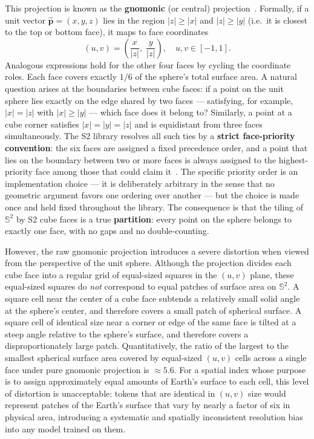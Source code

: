 \documentclass{book}
\begin{document}
This projection is known as the \textbf{gnomonic} (or central)
projection~\cite{snyder1987map}.  Formally, if a unit vector
$\hat{\mathbf{p}} = (x, y, z)$ lies in the region $|z| \geq |x|$ and
$|z| \geq |y|$ (i.e.\ it is closest to the top or bottom face), it
maps to face coordinates
\begin{equation}
  (u, v) = \left(\frac{x}{|z|},\; \frac{y}{|z|}\right),
  \quad u, v \in [-1, 1].
  \label{eq:gnomonic}
\end{equation}
Analogous expressions hold for the other four faces by cycling the
coordinate roles.  Each face covers exactly $1/6$ of the sphere's total
surface area. A natural question arises at the boundaries between cube
faces: if a point on the unit sphere lies exactly on the edge shared
by two faces --- satisfying, for example, $|x| = |z|$ with
$|x| \geq |y|$ --- which face does it belong to?  Similarly, a point
at a cube corner satisfies $|x| = |y| = |z|$ and is equidistant from
three faces simultaneously.  The S2 library resolves all such ties by
a \textbf{strict face-priority convention}: the six faces are assigned
a fixed precedence order, and a point that lies on the boundary
between two or more faces is always assigned to the highest-priority
face among those that could claim it~\cite{s2geometry}.  The specific
priority order is an implementation choice --- it is deliberately
arbitrary in the sense that no geometric argument favors one ordering
over another --- but the choice is made once and held fixed throughout
the library.  The consequence is that the tiling of $\mathbb{S}^2$
by S2 cube faces is a true \textbf{partition}: every point on the
sphere belongs to exactly one face, with no gaps and no
double-counting.

However, the raw gnomonic projection introduces a severe distortion
when viewed from the perspective of the unit sphere.  Although the
projection divides each cube face into a regular grid of equal-sized
squares in the $(u, v)$ plane, these equal-sized squares do \emph{not}
correspond to equal patches of surface area on $\mathbb{S}^2$.  A
square cell near the center of a cube face subtends a relatively small
solid angle at the sphere's center, and therefore covers a small patch
of spherical surface.  A square cell of identical size near a corner
or edge of the same face is tilted at a steep angle relative to the
sphere's surface, and therefore covers a disproportionately large
patch.  Quantitatively, the ratio of the largest to the smallest
spherical surface area covered by equal-sized $(u, v)$ cells across a
single face under pure gnomonic projection is $\approx 5.6$.  For a
spatial index whose purpose is to assign approximately equal amounts
of Earth's surface to each cell, this level of distortion is
unacceptable: tokens that are identical in $(u, v)$ size would
represent patches of the Earth's surface that vary by nearly a factor
of six in physical area, introducing a systematic and spatially
inconsistent resolution bias into any model trained on them.
 
\end{document}
